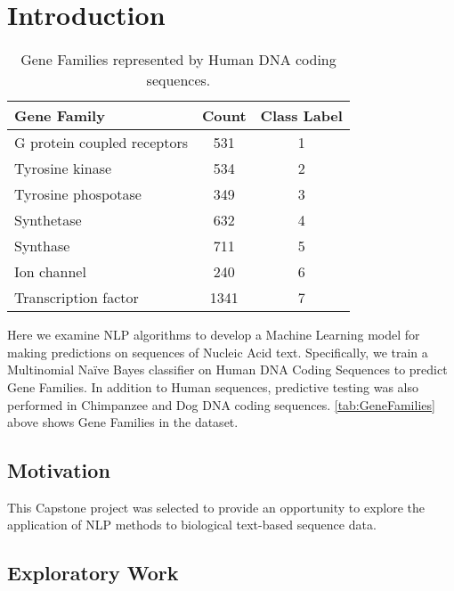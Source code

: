 \section{Introduction}

\begin{table}[tb]
  \centering
  \begin{tabular}{lSS}
    \toprule
    \textbf{Gene Family}      & \textbf{Count} & \textbf{Class Label}\\
    \midrule
    G protein coupled receptors	 & 531 & 1\\
    Tyrosine kinase	 & 534	 & 2\\
    Tyrosine phospotase	 & 349	 & 3\\
    Synthetase	 & 632	 & 4\\
    Synthase	 & 711	 & 5\\
    Ion channel	 & 240	 & 6\\
    Transcription factor	 & 1341	 & 7\\
    \bottomrule
  \end{tabular}
  \caption{
    Gene Families represented by Human DNA coding sequences.
  }
  \label{tab:GeneFamilies}
\end{table}

Here we examine NLP algorithms to develop a Machine Learning model for making predictions on sequences of Nucleic Acid text. Specifically, we train a Multinomial Na\"ive Bayes classifier on Human DNA Coding Sequences to predict Gene Families. In addition to Human sequences, predictive testing was also performed in Chimpanzee and Dog DNA coding sequences.
%
\autoref{tab:GeneFamilies} above shows Gene Families in the dataset.

\subsection{Motivation}

This Capstone project was selected to provide an opportunity to explore the application of NLP methods to biological text-based sequence data.


\subsection{Exploratory Work}

